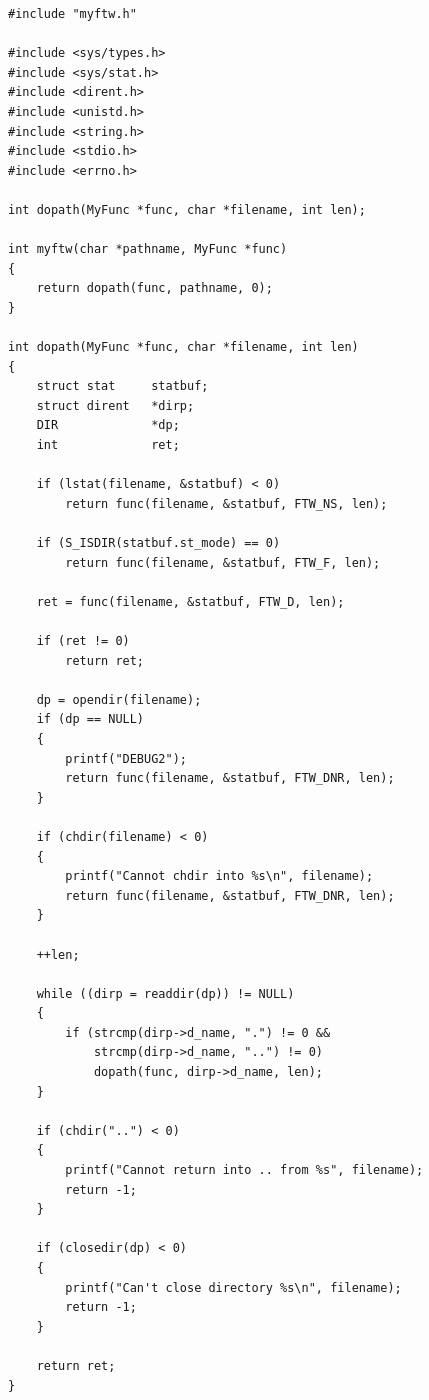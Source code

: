 \begin{lstlisting}[caption={Рекурсивная реализация myftw}]
#include "myftw.h"

#include <sys/types.h>
#include <sys/stat.h>
#include <dirent.h>
#include <unistd.h>
#include <string.h>
#include <stdio.h>
#include <errno.h>

int dopath(MyFunc *func, char *filename, int len);

int myftw(char *pathname, MyFunc *func)
{
    return dopath(func, pathname, 0);
}

int dopath(MyFunc *func, char *filename, int len)
{
    struct stat     statbuf;
    struct dirent   *dirp;
    DIR             *dp;
    int             ret;

    if (lstat(filename, &statbuf) < 0)
        return func(filename, &statbuf, FTW_NS, len);

    if (S_ISDIR(statbuf.st_mode) == 0)
        return func(filename, &statbuf, FTW_F, len);

    ret = func(filename, &statbuf, FTW_D, len);

    if (ret != 0)
        return ret;

    dp = opendir(filename);
    if (dp == NULL)
    {
        printf("DEBUG2");
        return func(filename, &statbuf, FTW_DNR, len);
    }

    if (chdir(filename) < 0)
    {
        printf("Cannot chdir into %s\n", filename);
        return func(filename, &statbuf, FTW_DNR, len);
    }

    ++len;

    while ((dirp = readdir(dp)) != NULL)
    {
        if (strcmp(dirp->d_name, ".") != 0 &&
            strcmp(dirp->d_name, "..") != 0)
            dopath(func, dirp->d_name, len);
    }

    if (chdir("..") < 0)
    {
        printf("Cannot return into .. from %s", filename);
        return -1;
    }

    if (closedir(dp) < 0)
    {
        printf("Can't close directory %s\n", filename);
        return -1;
    }

    return ret;
}
\end{lstlisting}

